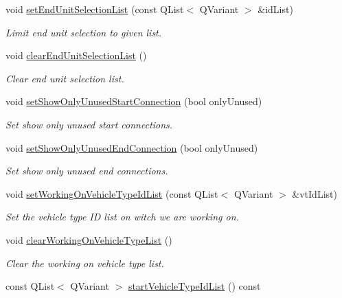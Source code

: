 \begin{DoxyCompactItemize}
void \hyperlink{classmdt_cl_unit_link_dialog_af4df48ddbeffce27bc9479ed36eb467a}{set\-End\-Unit\-Selection\-List} (const Q\-List$<$ Q\-Variant $>$ \&id\-List)
\begin{DoxyCompactList}\small\item\em Limit end unit selection to given list. \end{DoxyCompactList}\item 
void \hyperlink{classmdt_cl_unit_link_dialog_ac27cc9700c46dc37f810ddedcf843548}{clear\-End\-Unit\-Selection\-List} ()
\begin{DoxyCompactList}\small\item\em Clear end unit selection list. \end{DoxyCompactList}\item 
void \hyperlink{classmdt_cl_unit_link_dialog_a14665de1075d3a309584ceff17c26f0c}{set\-Show\-Only\-Unused\-Start\-Connection} (bool only\-Unused)
\begin{DoxyCompactList}\small\item\em Set show only unused start connections. \end{DoxyCompactList}\item 
void \hyperlink{classmdt_cl_unit_link_dialog_a1a2c3bcd9cdc90b57363a2b34b180f4c}{set\-Show\-Only\-Unused\-End\-Connection} (bool only\-Unused)
\begin{DoxyCompactList}\small\item\em Set show only unused end connections. \end{DoxyCompactList}\item 
void \hyperlink{classmdt_cl_unit_link_dialog_a9a3bc3f1de4e3d7dc6bc090965ab7bbc}{set\-Working\-On\-Vehicle\-Type\-Id\-List} (const Q\-List$<$ Q\-Variant $>$ \&vt\-Id\-List)
\begin{DoxyCompactList}\small\item\em Set the vehicle type I\-D list on witch we are working on. \end{DoxyCompactList}\item 
void \hyperlink{classmdt_cl_unit_link_dialog_a35865311a515cd14f4d6b5d4830238a2}{clear\-Working\-On\-Vehicle\-Type\-List} ()
\begin{DoxyCompactList}\small\item\em Clear the working on vehicle type list. \end{DoxyCompactList}\item 
const Q\-List$<$ Q\-Variant $>$ \hyperlink{classmdt_cl_unit_link_dialog_a38fb21e39ed2f2e1d65a68a424895ac4}{start\-Vehicle\-Type\-Id\-List} () const 

\end{DoxyCompactItemize}
